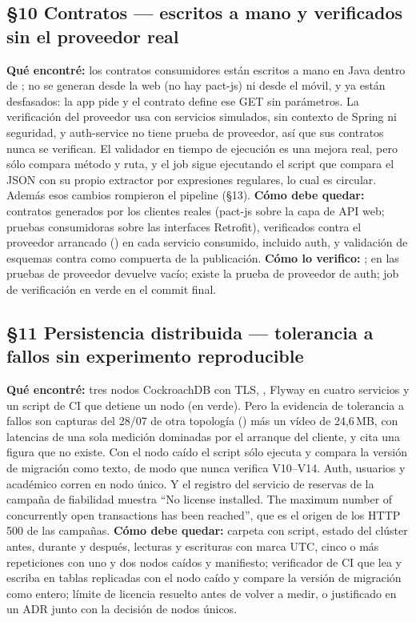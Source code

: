 \subsection*{\S10 Contratos --- escritos a mano y verificados sin el proveedor real}
\textbf{Qu\'e encontr\'e:} los contratos consumidores est\'an escritos a mano en Java dentro de ; no se generan desde la web (no hay pact-js) ni desde el m\'ovil, y ya est\'an desfasados: la app pide  y el contrato define ese GET sin par\'ametros. La verificaci\'on del proveedor usa  con servicios simulados, sin contexto de Spring ni seguridad, y auth-service no tiene prueba de proveedor, as\'i que sus contratos nunca se verifican. El validador en tiempo de ejecuci\'on es una mejora real, pero s\'olo compara m\'etodo y ruta, y el job  sigue ejecutando el script que compara el JSON con su propio extractor por expresiones regulares, lo cual es circular. Adem\'as esos cambios rompieron el pipeline (\S13). \textbf{C\'omo debe quedar:} contratos generados por los clientes reales (pact-js sobre la capa de API web; pruebas consumidoras sobre las interfaces Retrofit), verificados contra el proveedor arrancado () en cada servicio consumido, incluido auth, y validaci\'on de esquemas contra  como compuerta de la publicaci\'on. \textbf{C\'omo lo verifico:} ;  en las pruebas de proveedor devuelve vac\'io; existe la prueba de proveedor de auth; job de verificaci\'on en verde en el commit final.

\subsection*{\S11 Persistencia distribuida --- tolerancia a fallos sin experimento reproducible}
\textbf{Qu\'e encontr\'e:} tres nodos CockroachDB con TLS, , Flyway en cuatro servicios y un script de CI que detiene un nodo (en verde). Pero la evidencia de tolerancia a fallos son capturas del 28/07 de otra topolog\'ia () m\'as un v\'ideo de 24,6\,MB, con latencias de una sola medici\'on dominadas por el arranque del cliente, y cita una figura que no existe. Con el nodo ca\'ido el script s\'olo ejecuta  y compara la versi\'on de migraci\'on como texto, de modo que nunca verifica V10--V14. Auth, usuarios y acad\'emico corren en nodo \'unico. Y el registro del servicio de reservas de la campa\~na de fiabilidad muestra ``No license installed. The maximum number of concurrently open transactions has been reached'', que es el origen de los HTTP 500 de las campa\~nas. \textbf{C\'omo debe quedar:} carpeta  con script, estado del cl\'uster antes, durante y despu\'es, lecturas y escrituras con marca UTC, cinco o m\'as repeticiones con uno y dos nodos ca\'idos y manifiesto; verificador de CI que lea y escriba en tablas replicadas con el nodo ca\'ido y compare la versi\'on de migraci\'on como entero; l\'imite de licencia resuelto antes de volver a medir, o justificado en un ADR junto con la decisi\'on de nodos \'unicos.

